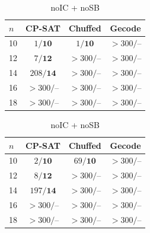 \documentclass{article}
\begin{document}
\begin{table}[H]\centering\small
\begin{minipage}{.48\textwidth}\centering
\begin{tabular}{l|ccc}\toprule
$n$ & CP-SAT & Chuffed & Gecode\\\midrule
10 & $1/\mathbf{10}$ & $1/\mathbf{10}$ & \(>300/\text{--}\)\\
12 & $7/\mathbf{12}$ & \(>300/\text{--}\) & \(>300/\text{--}\)\\
14 & $208/\mathbf{14}$ & \(>300/\text{--}\) & \(>300/\text{--}\)\\
16 & \(>300/\text{--}\) & \(>300/\text{--}\) & \(>300/\text{--}\)\\
18 & \(>300/\text{--}\) & \(>300/\text{--}\) & \(>300/\text{--}\)\\\bottomrule
\end{tabular}
\caption{noIC (SB on)}
\end{minipage}\hfill
\begin{minipage}{.48\textwidth}\centering
\begin{tabular}{l|ccc}\toprule
$n$ & CP-SAT & Chuffed & Gecode\\\midrule
10 & $2/\mathbf{10}$ & $69/\mathbf{10}$ & \(>300/\text{--}\)\\
12 & $8/\mathbf{12}$ & \(>300/\text{--}\) & \(>300/\text{--}\)\\
14 & $197/\mathbf{14}$ & \(>300/\text{--}\) & \(>300/\text{--}\)\\
16 & \(>300/\text{--}\) & \(>300/\text{--}\) & \(>300/\text{--}\)\\
18 & \(>300/\text{--}\) & \(>300/\text{--}\) & \(>300/\text{--}\)\\\bottomrule
\end{tabular}
\caption{noIC + noSB}
\end{minipage}
\end{table}
\end{document}
